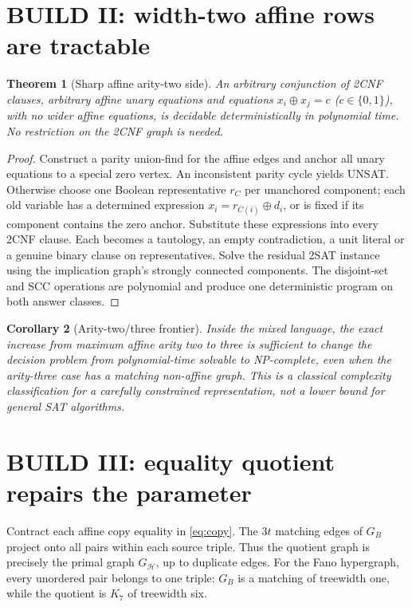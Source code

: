 \documentclass[11pt]{article}
\newtheorem{theorem}{Theorem}
\newtheorem{corollary}[theorem]{Corollary}
\begin{document}
\section{BUILD II: width-two affine rows are tractable}
\begin{theorem}[Sharp affine arity-two side]\label{thm:easy}
An arbitrary conjunction of 2CNF clauses, arbitrary affine unary equations and equations $x_i\oplus x_j=c$ ($c\in\{0,1\}$), with no wider affine equations, is decidable deterministically in polynomial time. No restriction on the 2CNF graph is needed.
\end{theorem}
\begin{proof}
Construct a parity union-find for the affine edges and anchor all unary equations to a special zero vertex. An inconsistent parity cycle yields UNSAT. Otherwise choose one Boolean representative $r_C$ per unanchored component; each old variable has a determined expression $x_i=r_{C(i)}\oplus d_i$, or is fixed if its component contains the zero anchor. Substitute these expressions into every 2CNF clause. Each becomes a tautology, an empty contradiction, a unit literal or a genuine binary clause on representatives. Solve the residual 2SAT instance using the implication graph's strongly connected components. The disjoint-set and SCC operations are polynomial and produce one deterministic program on both answer classes.
\end{proof}
\begin{corollary}[Arity-two/three frontier]
Inside the mixed language, the exact increase from maximum affine arity two to three is sufficient to change the decision problem from polynomial-time solvable to NP-complete, even when the arity-three case has a matching non-affine graph. This is a classical complexity classification for a carefully constrained representation, not a lower bound for general SAT algorithms.
\end{corollary}

\section{BUILD III: equality quotient repairs the parameter}
Contract each affine copy equality in \eqref{eq:copy}. The $3t$ matching edges of $G_B$ project onto all pairs within each source triple. Thus the quotient graph is precisely the primal graph $G_{\mathcal H}$, up to duplicate edges. For the Fano hypergraph, every unordered pair belongs to one triple: $G_B$ is a matching of treewidth one, while the quotient is $K_7$ of treewidth six.
\end{document}
